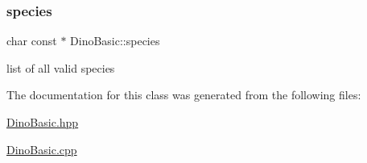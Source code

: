 \mbox{\label{classDinoBasic_a8d6be833bf21a18219bb65258f8a4eb8}} 
\subsubsection{\texorpdfstring{species}{species}}
{\footnotesize\ttfamily char const  $\ast$ Dino\+Basic\+::species\hspace{0.3cm}{\ttfamily [static]}}



list of all valid species 



The documentation for this class was generated from the following files\+:\begin{DoxyCompactItemize}
\item 
\hyperlink{DinoBasic_8hpp}{Dino\+Basic.\+hpp}\item 
\hyperlink{DinoBasic_8cpp}{Dino\+Basic.\+cpp}\end{DoxyCompactItemize}
